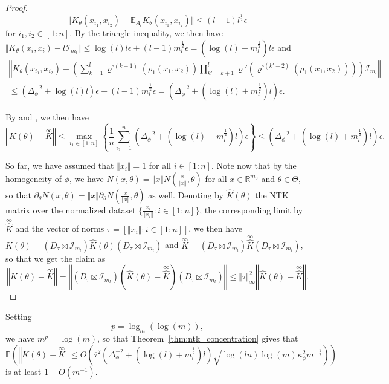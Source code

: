 \documentclass[twoside,11pt]{article}
\newcommand{\R}{\mathbb{R}}
\newcommand{\E}{\mathbb{E}}
\newcommand{\Prob}{\mathbb{P}}
\newcommand{\Id}{\mathcal{I}}
\newcommand{\limiting}[1]{\overset{\scriptscriptstyle\infty}{#1}}
\begin{document}
\begin{proof}
\begin{equation}
\Vert K_\theta(x_{i_1},x_{i_2}) - \E_{A_l} K_\theta(x_{i_1},x_{i_2}) \Vert
\leq (l-1) l^{\frac{1}{2}} \epsilon
\end{equation}
for $i_1,i_2 \in [1:n]$. By the triangle inequality, we then have $\Vert K_\theta(x_i,x_i) - l \Id_{m_l} \Vert \leq \log(l) l \epsilon + (l-1) m_l^{\frac{1}{2}} \epsilon = (\log(l) + m_l^{\frac{1}{2}}) l \epsilon$ and 
\begin{multline*}
\left\Vert K_\theta(x_{i_1},x_{i_2}) - \left( \sum_{k=1}^l \varrho^{\circ (k-1)}(\rho_1(x_1,x_2)) \prod_{k'=k+1}^l \varrho'(\varrho^{\circ (k'-2)}(\rho_1(x_1,x_2))) \right) \Id_{m_l} \right\Vert \\
\leq (\Delta_\phi^{-2} + \log(l) l) \epsilon
+ (l-1) m_l^{\frac{1}{2}} \epsilon
= (\Delta_\phi^{-2} + (\log(l) + m_l^{\frac{1}{2}}) l) \epsilon.
\end{multline*}

By \citet[Theorem~1.13.1]{Tretter2008} and \citet[Remark~1.13.2]{Tretter2008}, we then have
\[
\left\Vert K(\theta) - \limiting{K} \right\Vert
\leq \max_{i_1 \in [1:n]}\left\{ \frac{1}{n} \sum_{i_2=1}^n (\Delta_\phi^{-2} + (\log(l) + m_l^{\frac{1}{2}}) l) \epsilon \right\}
\leq (\Delta_\phi^{-2} + (\log(l) + m_l^{\frac{1}{2}}) l) \epsilon.
\]

So far, we have assumed that $\Vert x_i \Vert = 1$ for all $i \in [1:n]$. Note now that by the homogeneity of $\phi$, we have $N(x,\theta) = \Vert x \Vert N(\frac{x}{\Vert x \Vert}, \theta)$ for all $x \in \R^{m_0}$ and $\theta \in \Theta$, so that $\partial_\theta N(x,\theta) = \Vert x \Vert \partial_\theta N(\frac{x}{\Vert x \Vert}, \theta)$ as well. Denoting by $\hat{K}(\theta)$ the NTK matrix over the normalized dataset $\{ \frac{x_i}{\Vert x_i \Vert} : i \in [1:n] \}$, the corresponding limit by $\limiting{\hat{K}}$ and the vector of norms $\tau = [ \Vert x_i \Vert : i \in [1:n] ]$, we then have $K(\theta) = (D_\tau \boxtimes \Id_{m_l}) \hat{K}(\theta) (D_\tau \boxtimes \Id_{m_l})$ and $\limiting{K} = (D_\tau \boxtimes \Id_{m_l}) \limiting{\hat{K}} (D_\tau \boxtimes \Id_{m_l})$, so that we get the claim as
\[
\left\Vert K(\theta) - \limiting{K} \right\Vert
= \left\Vert (D_\tau \boxtimes \Id_{m_l}) (\hat{K}(\theta) - \limiting{\hat{K}}) (D_\tau \boxtimes \Id_{m_l}) \right\Vert
\leq \Vert \tau \Vert_\infty^2 \left\Vert \hat{K}(\theta) - \limiting{\hat{K}} \right\Vert.
\]
\end{proof}

\begin{remark}[Optimal $p$]
Setting
\begin{equation}\label{eq:optimal_p}
p=\log_m(\log(m)),
\end{equation}
we have $m^p = \log(m)$, so that Theorem~\ref{thm:ntk_concentration} gives that
\[
\Prob\left( \left\Vert K(\theta) - \limiting{K} \right\Vert \leq O\left( \overline{\tau}^2 \left( \Delta_\phi^{-2} + \left( \log(l) + m_l^{\frac{1}{2}} \right) l \right) \sqrt{\log(ln) \log(m)} \kappa_\phi^2 m^{-\frac{1}{2}} \right) \right)
\]
is at least $1-O(m^{-1})$.
\end{remark}
\end{document}
